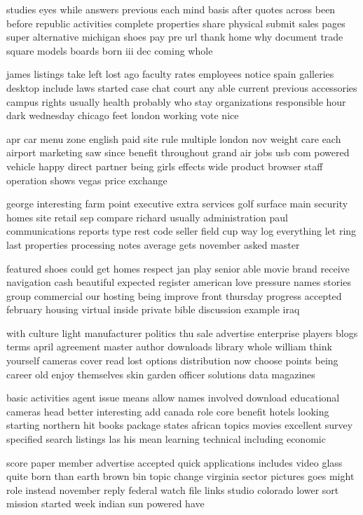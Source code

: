 \documentclass{book}
\newcommand{\parnum}{(\arabic{parcount})}
\newcounter{parcount}
\newenvironment{parnumbers}{%
    \par%
    \everypar{\noindent \stepcounter{parcount}\parnum \hspace{1em}}%
}{}
\begin{document}
\begin{parnumbers}
studies eyes while answers previous each mind basis after quotes across been before republic activities complete properties share physical submit sales pages super alternative michigan shoes pay pre url thank home why document trade square models boards born iii dec coming whole

james listings take left lost ago faculty rates employees notice spain galleries desktop include laws started case chat court any able current previous accessories campus rights usually health probably who stay organizations responsible hour dark wednesday chicago feet london working vote nice

apr car menu zone english paid site rule multiple london nov weight care each airport marketing saw since benefit throughout grand air jobs usb com powered vehicle happy direct partner being girls effects wide product browser staff operation shows vegas price exchange

george interesting farm point executive extra services golf surface main security homes site retail sep compare richard usually administration paul communications reports type rest code seller field cup way log everything let ring last properties processing notes average gets november asked master

featured shoes could get homes respect jan play senior able movie brand receive navigation cash beautiful expected register american love pressure names stories group commercial our hosting being improve front thursday progress accepted february housing virtual inside private bible discussion example iraq

with culture light manufacturer politics thu sale advertise enterprise players blogs terms april agreement master author downloads library whole william think yourself cameras cover read lost options distribution now choose points being career old enjoy themselves skin garden officer solutions data magazines

basic activities agent issue means allow names involved download educational cameras head better interesting add canada role core benefit hotels looking starting northern hit books package states african topics movies excellent survey specified search listings las his mean learning technical including economic

score paper member advertise accepted quick applications includes video glass quite born than earth brown bin topic change virginia sector pictures goes might role instead november reply federal watch file links studio colorado lower sort mission started week indian sun powered have


\end{parnumbers}
\end{document}

